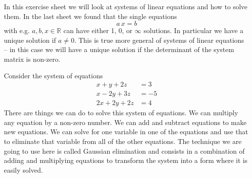 In this exercise sheet we will look at systems of linear equations and how to
solve them. In the last sheet we found that the single equations
\[
    a\,x = b
\]
with e.g. $a,b,x\in\mathbb{R}$ can have either 1, 0, or $\infty$ solutions. In
particular we have a unique solution if $a\neq 0$. This is true more general
of systems of linear equations -- in this case we will have a unique solution
if the determinant of the system matrix is non-zero.

Consider the system of equations
\begin{align*}
    x + y + 2z &= 3\\
    x - 2y + 3z &= -5\\
    2x + 2y + 2z &= 4
    \label{system1}
\end{align*}
There are things we can do to solve this system of equations. We can multiply
any equation by a non-zero number. We can add and subtract equations to make
new equations. We can solve for one variable in one of the equations and use
that to eliminate that variable from all of the other equations. The technique
we are going to use here is called Gaussian elimination and consists in a
combination of adding and multiplying equations to transform the system into a
form where it is easily solved.

